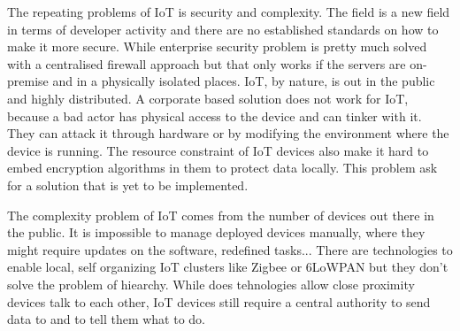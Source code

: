 The repeating problems of IoT is security and complexity. The field is a new field in terms of developer activity and there are no established standards on how to make it more secure. While enterprise security problem is pretty much solved with a centralised firewall approach but that only works if the servers are on-premise and in a physically isolated places. IoT, by nature, is out in the public and highly distributed. A corporate based solution does not work for IoT, because a bad actor has physical access to the device and can tinker with it. They can attack it through hardware or by modifying the environment where the device is running. The resource constraint of IoT devices also make it hard to embed encryption algorithms in them to protect data locally. This problem ask for a solution that is yet to be implemented.

The complexity problem of IoT comes from the number of devices out there in the public. It is impossible to manage deployed devices manually, where they might require updates on the software, redefined tasks... There are technologies to enable local, self organizing IoT clusters like Zigbee or 6LoWPAN but they don't solve the problem of hiearchy. While does tehnologies allow close proximity devices talk to each other, IoT devices still require a central authority to send data to and to tell them what to do.


